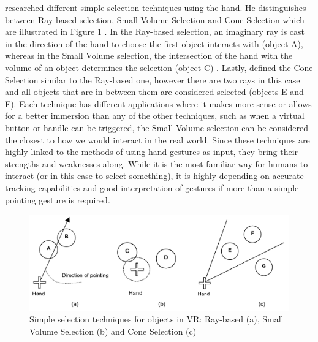 \cite{Steed2006} researched different simple selection techniques using the hand. He distinguishes between Ray-based selection, Small Volume Selection and Cone Selection which are illustrated in Figure \ref{fig:selectiontechniques} \citep{Steed2006}. In the Ray-based selection, an imaginary ray is cast in the direction of the hand to choose the first object interacts with (object A), whereas in the Small Volume selection, the intersection of the hand with the volume of an object determines the selection (object C) \citep{Steed2006}. Lastly, \cite{Steed2006} defined the Cone Selection similar to the Ray-based one, however there are two rays in this case and all objects that are in between them are considered selected (objects E and F). \newline
Each technique has different applications where it makes more sense or allows for a better immersion than any of the other techniques, such as when a virtual button or handle can be triggered, the Small Volume selection can be considered the closest to how we would interact in the real world. \newline
Since these techniques are highly linked to the methods of using hand gestures as input, they bring their strengths and weaknesses along. While it is the most familiar way for humans to interact (or in this case to select something), it is highly depending on accurate tracking capabilities and good interpretation of gestures if more than a simple pointing gesture is required.
\begin{figure}[h]
	\begin{center}
		\includegraphics[width=14cm]{03_Figures/05_LitReview/Steed2006_SelectionTechniques.png}
		\caption[Simple selection techniques for objects in VR: Ray-based, Small Volume Selection and Cone Selection]{Simple selection techniques for objects in VR: Ray-based (a), Small Volume Selection (b) and Cone Selection (c) \citep{Steed2006}}
		\label{fig:selectiontechniques}
	\end{center}
\end{figure}


